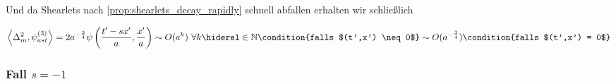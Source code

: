 Und da Shearlets nach \cref{prop:shearlets_decay_rapidly} schnell abfallen erhalten wir schließlich

\begin{dmath}
    \left\langle \Delta_m^{2}, \psi_{ast}^{(3)}\right\rangle
    = 2 a^{-\frac{3}{4}} \psi \left(\frac{t'-sx'}{a}, \frac{x'}{a}\right)
    \sim O(a^k) ~\forall k \hiderel \in \mathbb{N} \condition{falls $(t',x') \neq 0$}
    \sim O(a^{-\frac{3}{4}}) \condition{falls $(t',x') = 0$}
\label{eq:delta_m2_s<1}
\end{dmath}

\subsubsection*{\texorpdfstring{Fall $s = -1$}{Fall s = 1}}

